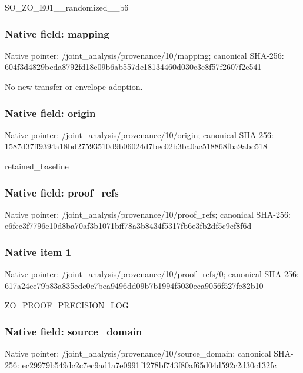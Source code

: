 \documentclass[10pt,a4paper]{article}
\begin{document}
\begingroup\raggedright\sloppy SO\_\allowbreak{}ZO\_\allowbreak{}E01\_\allowbreak{}\_\allowbreak{}randomized\_\allowbreak{}\_\allowbreak{}b6\par\endgroup

\subsubsection{Native field: mapping}
Native pointer: /joint\_\allowbreak{}analysis/provenance/10/mapping; canonical SHA-256: 604f3d4829bcda8792fd18e09b6ab557de18134460d030c3e8f57f2607f2e541

\begingroup\raggedright\sloppy No new transfer or envelope adoption.\par\endgroup

\subsubsection{Native field: origin}
Native pointer: /joint\_\allowbreak{}analysis/provenance/10/origin; canonical SHA-256: 1587d37ff9394a18bd27593510d9b06024d7bec02b3ba0ac518868fba9abc518

\begingroup\raggedright\sloppy retained\_\allowbreak{}baseline\par\endgroup

\subsubsection{Native field: proof\_\allowbreak{}refs}
Native pointer: /joint\_\allowbreak{}analysis/provenance/10/proof\_\allowbreak{}refs; canonical SHA-256: e6fec3f7796e10d8ba70af3b1071bff78a3b8434f5317fb6e3fb2df5c9ef8f6d

\subsubsection{Native item 1}
Native pointer: /joint\_\allowbreak{}analysis/provenance/10/proof\_\allowbreak{}refs/0; canonical SHA-256: 617a24ce79b83a835edc0c7bea9496dd09b7b1994f5030eea9056f527fe82b10

\begingroup\raggedright\sloppy ZO\_\allowbreak{}PROOF\_\allowbreak{}PRECISION\_\allowbreak{}LOG\par\endgroup

\subsubsection{Native field: source\_\allowbreak{}domain}
Native pointer: /joint\_\allowbreak{}analysis/provenance/10/source\_\allowbreak{}domain; canonical SHA-256: ec29979b549dc2c7ec9ad1a7e0991f1278bf743f80af65d04d592c2d30c132fc
\end{document}
